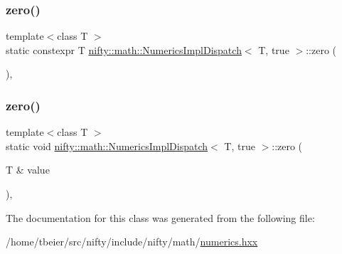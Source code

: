 \mbox{\label{classnifty_1_1math_1_1NumericsImplDispatch_3_01T_00_01true_01_4_a9b03d43866c3215a3350e253c405d340}} 
\subsubsection{\texorpdfstring{zero()}{zero()}\hspace{0.1cm}{\footnotesize\ttfamily [1/2]}}
{\footnotesize\ttfamily template$<$class T $>$ \\
static constexpr T \hyperlink{classnifty_1_1math_1_1NumericsImplDispatch}{nifty\+::math\+::\+Numerics\+Impl\+Dispatch}$<$ T, true $>$\+::zero (\begin{DoxyParamCaption}{ }\end{DoxyParamCaption})\hspace{0.3cm}{\ttfamily [inline]}, {\ttfamily [static]}}

\mbox{\label{classnifty_1_1math_1_1NumericsImplDispatch_3_01T_00_01true_01_4_aa8c1fee5ba420a6b2fce989b2b37a5d4}} 
\subsubsection{\texorpdfstring{zero()}{zero()}\hspace{0.1cm}{\footnotesize\ttfamily [2/2]}}
{\footnotesize\ttfamily template$<$class T $>$ \\
static void \hyperlink{classnifty_1_1math_1_1NumericsImplDispatch}{nifty\+::math\+::\+Numerics\+Impl\+Dispatch}$<$ T, true $>$\+::zero (\begin{DoxyParamCaption}\item[{T \&}]{value }\end{DoxyParamCaption})\hspace{0.3cm}{\ttfamily [inline]}, {\ttfamily [static]}}



The documentation for this class was generated from the following file\+:\begin{DoxyCompactItemize}
\item 
/home/tbeier/src/nifty/include/nifty/math/\hyperlink{numerics_8hxx}{numerics.\+hxx}\end{DoxyCompactItemize}
